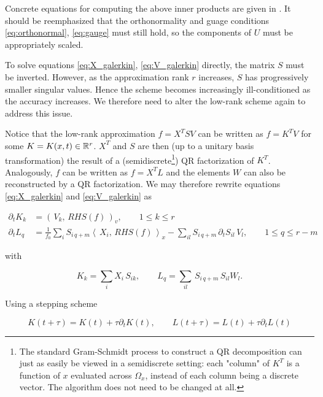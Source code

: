Concrete equations for computing the above inner products are given in 
\cite{robustlowrank}. It should be reemphasized that the orthonormality and guage 
conditions \ref{eq:orthonormal}, \ref{eq:gauge} must still hold, so the components of $U$ 
must be appropriately scaled. 

To solve equations \ref{eq:X_galerkin}, \ref{eq:V_galerkin} directly, the matrix $S$ must 
be inverted. However, as the approximation rank $r$ increases, $S$ has progressively 
smaller singular values. Hence the scheme becomes increasingly ill-conditioned as the 
accuracy increases. We therefore need to alter the low-rank scheme again to address this 
issue. 

Notice that the low-rank approximation $f = X^T S V$ can be written as $f = K^T V$ for 
some $K = K(x, t) \in \mathbb{R}^r$. $X^T$ and $S$ are then (up to a unitary basis 
transformation) the result of a (semidiscrete\footnote{
    The standard Gram-Schmidt process to construct a QR decomposition can just as easily 
    be viewed in a semidiscrete setting: each "column" of $K^T$ is a function of $x$ 
    evaluated across $\Omega_x$, instead of each column being a discrete vector. The 
    algorithm does not need to be changed at all. 
}) QR factorization of $K^T$. Analogously, $f$ can be written as $f = X^T L$ and the 
elements $W$ can also be reconstructed by a QR factorization. We may therefore rewrite 
equations \ref{eq:X_galerkin} and \ref{eq:V_galerkin} as 

\begin{align}
    \partial_t K_k &= (\,V_k,\, RHS(f)\,)_v, \quad\quad 1 \leq k \leq r \label{eq:K_galerkin}\\
    \partial_t L_q &= 
        \frac{1}{f_0} \sum_i S_{i\, q+m} \left\langle\, X_i,\, RHS(f) \,\right\rangle_x 
        - \sum_{i l} S_{i\, q+m}\, \partial_t S_{i l}\, V_l ,
        \quad\quad 1 \leq q \leq r - m \label{eq:L_galerkin} 
\end{align}

with 

\begin{equation}
    K_k = \sum_i X_i\, S_{i k}, \quad\quad L_q = \sum_{i l}\, S_{i\, q+m}\, S_{i l} W_l . 
\end{equation}

Using a stepping scheme

\begin{equation}
    K (t + \tau) = K (t) + \tau \partial_t K (t), \quad\quad
    L (t + \tau) = L (t) + \tau \partial_t L (t)
\end{equation}

